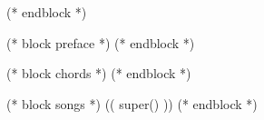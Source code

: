\renewcommand{\lyricfont}{%
   (* for letter in template_var.versefont *)
   (* if letter=="i" *)   \it %
   (* elif letter=='b' *)   \bf %
   (* elif letter=='n' *)   \normalfont %
   (* endif *)
   (* endfor *)
   \lyricsize
}
\makeatother

\geometry{
 ((template_var.geometry))
}

\let\OldSongColumns=\songcolumns
\def\songcolumns#1{%
	(* if template_var.column_adjustment=="only_one" *)
	\OldSongColumns{1}
	(* elif template_var.column_adjustment=="two" *)
		\ifnum\value{inchordblock}>0
			\count0=#1\relax\advance\count0 by 1\relax%
			\OldSongColumns{2}
		\else
			\OldSongColumns{1}
		\fi
	(* elif template_var.column_adjustment=="one_more" *)
	\count0=#1\relax\advance\count0 by 1\relax%
	\OldSongColumns{\count0}
	(* else *)
	\OldSongColumns{#1}
	(* endif *)
}

\makeatletter
\let\quote@name\unquote@name
\makeatother
%
%

(* endblock *)

(* block preface *)
(* endblock *)

(* block chords *)
(* endblock *)

(* block songs *)
\setcounter{inchordblock}{1}
(( super() ))
\let\songcolumns=\OldSongColumns
(* endblock *)
